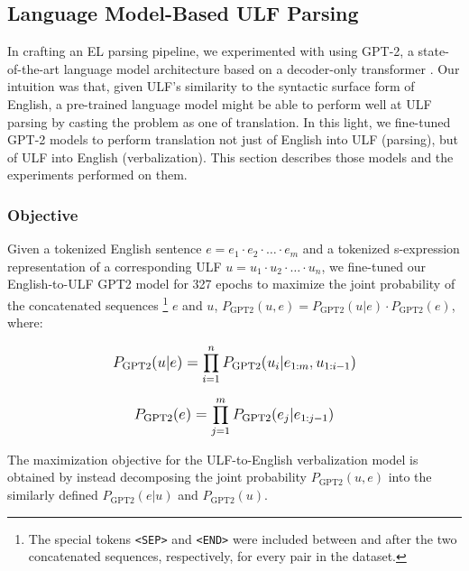 \subsection{Language Model-Based ULF Parsing}
In crafting an EL parsing pipeline, we experimented with using GPT-2, a state-of-the-art language model architecture based on a decoder-only transformer \citep{Radford2019LanguageMA}. Our intuition was that, given ULF's similarity to the syntactic surface form of English, a pre-trained language model might be able to perform well at ULF parsing by casting the problem as one of translation. In this light, we fine-tuned GPT-2 models to perform translation not just of English into ULF (parsing), but of ULF into English (verbalization). This section describes those models and the experiments performed on them.
\subsubsection{Objective}
Given a tokenized English sentence $e = e_{1} \cdot e_{2} \cdot \ldots \cdot e_{m}$ and a tokenized s-expression representation of a corresponding ULF $u = u_{1} \cdot u_{2} \cdot \ldots \cdot u_{n}$, we fine-tuned our English-to-ULF GPT2 model for 327 epochs to maximize the joint probability of the concatenated sequences \footnote{The special tokens \texttt{<SEP>} and \texttt{<END>} were included between and after the two concatenated sequences, respectively, for every pair in the dataset.} $e$ and $u$, $P_{\textrm{GPT2}}(u,e) = P_{\textrm{GPT2}}(u|e) \cdot P_{\textrm{GPT2}}(e)$, where:

\vspace{3mm}

$$\mathlarger{P_{\textrm{GPT2}}(u|e) = \prod_{i=1}^{n} P_{\textrm{GPT2}}(u_{i} | e_{1:m},u_{1:i-1})}$$
\vspace{1mm}

$$\mathlarger{P_{\textrm{GPT2}}(e) = \prod_{j=1}^{m} P_{\textrm{GPT2}}(e_{j} | e_{1:j-1})}$$

\vspace{3mm}

The maximization objective for the ULF-to-English verbalization model is obtained by instead decomposing the joint probability $P_{\textrm{GPT2}}(u,e)$ into the similarly defined $P_{\textrm{GPT2}}(e|u)$ and $P_{\textrm{GPT2}}(u)$.

